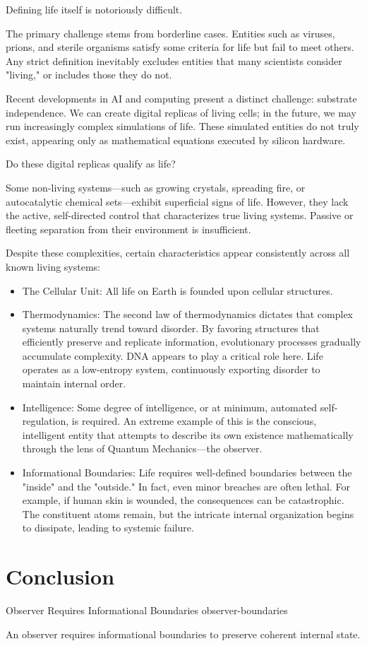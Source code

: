 Defining life itself is notoriously difficult.

The primary challenge stems from borderline cases.
Entities such as viruses, prions, and sterile organisms satisfy some criteria for life but fail to meet others.
Any strict definition inevitably excludes entities that many scientists consider "living," or includes those they do not.

Recent developments in AI and computing present a distinct challenge: substrate independence.
We can create digital replicas of living cells; in the future, we may run increasingly complex simulations of life.
These simulated entities do not truly exist, appearing only as mathematical equations executed by silicon hardware.

Do these digital replicas qualify as life?

Some non-living systems—such as growing crystals, spreading fire, or autocatalytic chemical sets—exhibit superficial signs of life.
However, they lack the active, self-directed control that characterizes true living systems.
Passive or fleeting separation from their environment is insufficient.

Despite these complexities, certain characteristics appear consistently across all known living systems:

\begin{itemize}
\item The Cellular Unit: All life on Earth is founded upon cellular structures.

\item Thermodynamics: The second law of thermodynamics dictates that complex systems naturally trend toward disorder.
  By favoring structures that efficiently preserve and replicate information, evolutionary processes gradually accumulate complexity.
  DNA appears to play a critical role here. Life operates as a low-entropy system, continuously exporting disorder to maintain internal order.

\item Intelligence: Some degree of intelligence, or at minimum, automated self-regulation, is required.
  An extreme example of this is the conscious, intelligent entity that attempts to describe its own existence mathematically through the lens of Quantum Mechanics—the observer. 

\item Informational Boundaries: Life requires well-defined boundaries between the "inside" and the "outside."
  In fact, even minor breaches are often lethal. For example, if human skin is wounded, the consequences can be catastrophic.
  The constituent atoms remain, but the intricate internal organization begins to dissipate, leading to systemic failure.
\end{itemize}


\section{Conclusion}

\begin{principle}{Observer Requires Informational Boundaries}
{observer-boundaries}

An observer requires informational boundaries to preserve coherent internal state.

\end{principle}
